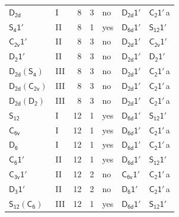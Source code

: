 \documentclass[10pt,a4paper]{article}
\numberwithin{equation}{section}
\newcommand{\grp}[1]{\mathsf{#1}}
\newcommand{\clsletter}[1]{\,{\scriptsize\color{black!55}#1}}
\begin{document}
{\begin{longtable}{@{}llrrlll@{}}
\href{../../../rotation/data/pdf/D2d.pdf}{$\grp{D_{2d}}$} & I & 8 & 3 & no & \href{D2d-1p.pdf}{$\grp{D_{2d}1'}$} & \href{C2-1p.pdf}{$\grp{C_{2}1'}$}\clsletter{a}\\
\href{S4-1p.pdf}{$\grp{S_{4}1'}$} & II & 8 & 1 & yes & \href{D6d-1p.pdf}{$\grp{D_{6d}1'}$} & \href{S12-1p.pdf}{$\grp{S_{12}1'}$}\\
\href{C2v-1p.pdf}{$\grp{C_{2v}1'}$} & II & 8 & 3 & no & \href{D2d-1p.pdf}{$\grp{D_{2d}1'}$} & \href{C2v-1p.pdf}{$\grp{C_{2v}1'}$}\\
\href{D2-1p.pdf}{$\grp{D_{2}1'}$} & II & 8 & 3 & no & \href{D2d-1p.pdf}{$\grp{D_{2d}1'}$} & \href{D2-1p.pdf}{$\grp{D_{2}1'}$}\\
\href{D2d-S4.pdf}{$\grp{D_{2d}}(\grp{S_{4}})$} & III & 8 & 3 & no & \href{D2d-1p.pdf}{$\grp{D_{2d}1'}$} & \href{C2-1p.pdf}{$\grp{C_{2}1'}$}\clsletter{a}\\
\href{D2d-C2v.pdf}{$\grp{D_{2d}}(\grp{C_{2v}})$} & III & 8 & 3 & no & \href{D2d-1p.pdf}{$\grp{D_{2d}1'}$} & \href{C2-1p.pdf}{$\grp{C_{2}1'}$}\clsletter{a}\\
\href{D2d-D2.pdf}{$\grp{D_{2d}}(\grp{D_{2}})$} & III & 8 & 3 & no & \href{D2d-1p.pdf}{$\grp{D_{2d}1'}$} & \href{C2-1p.pdf}{$\grp{C_{2}1'}$}\clsletter{a}\\
\href{../../../rotation/data/pdf/S12.pdf}{$\grp{S_{12}}$} & I & 12 & 1 & yes & \href{D6d-1p.pdf}{$\grp{D_{6d}1'}$} & \href{S12-1p.pdf}{$\grp{S_{12}1'}$}\\
\href{../../../rotation/data/pdf/C6v.pdf}{$\grp{C_{6v}}$} & I & 12 & 1 & yes & \href{D6d-1p.pdf}{$\grp{D_{6d}1'}$} & \href{C2-1p.pdf}{$\grp{C_{2}1'}$}\clsletter{a}\\
\href{../../../rotation/data/pdf/D6.pdf}{$\grp{D_{6}}$} & I & 12 & 1 & yes & \href{D6d-1p.pdf}{$\grp{D_{6d}1'}$} & \href{C2-1p.pdf}{$\grp{C_{2}1'}$}\clsletter{a}\\
\href{C6-1p.pdf}{$\grp{C_{6}1'}$} & II & 12 & 1 & yes & \href{D6d-1p.pdf}{$\grp{D_{6d}1'}$} & \href{S12-1p.pdf}{$\grp{S_{12}1'}$}\\
\href{C3v-1p.pdf}{$\grp{C_{3v}1'}$} & II & 12 & 2 & no & \href{C6v-1p.pdf}{$\grp{C_{6v}1'}$} & \href{C2-1p.pdf}{$\grp{C_{2}1'}$}\clsletter{a}\\
\href{D3-1p.pdf}{$\grp{D_{3}1'}$} & II & 12 & 2 & no & \href{D6-1p.pdf}{$\grp{D_{6}1'}$} & \href{C2-1p.pdf}{$\grp{C_{2}1'}$}\clsletter{a}\\
\href{S12-C6.pdf}{$\grp{S_{12}}(\grp{C_{6}})$} & III & 12 & 1 & yes & \href{D6d-1p.pdf}{$\grp{D_{6d}1'}$} & \href{S12-1p.pdf}{$\grp{S_{12}1'}$}\\

\end{longtable}}
\end{document}

